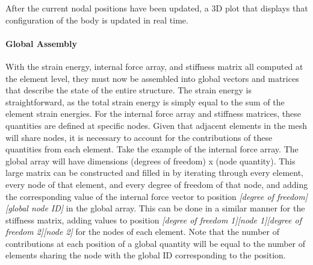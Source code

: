 \documentclass[]{spie}  %
\begin{document}
After the current nodal positions have been updated, a 3D plot that displays that configuration of the body is updated in real time. 

\paragraph{Global Assembly}
With the strain energy, internal force array, and stiffness matrix all computed at the element level, they must now be assembled into global vectors and matrices that describe the state of the entire structure. The strain energy is straightforward, as the total strain energy is simply equal to the sum of the element strain energies. For the internal force array and stiffness matrices, these quantities are defined at specific nodes. Given that adjacent elements in the mesh will share nodes, it is necessary to account for the contributions of these quantities from each element. Take the example of the internal force array. The global array will have dimensions (degrees of freedom) x (node quantity). This large matrix can be constructed and filled in by iterating through every element, every node of that element, and every degree of freedom of that node, and adding the corresponding value of the internal force vector to position \textit{[degree of freedom][global node ID]} in the global array. This can be done in a similar manner for the stiffness matrix, adding values to position \textit{[degree of freedom 1][node 1][degree of freedom 2][node 2]} for the nodes of each element. Note that the number of contributions at each position of a global quantity will be equal to the number of elements sharing the node with the global ID corresponding to the position.
\end{document}
